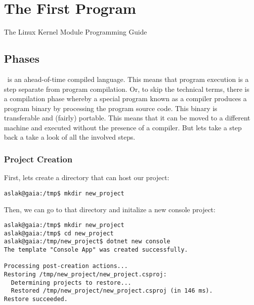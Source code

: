 \chapter{The First Program}
\label{sec:first}

\begin{inspiration}{The Linux Kernel Module Programming Guide\cite{lkmpg20070518}}
\end{inspiration}

\section{Phases}

\csharp\ is an ahead-of-time compiled language. This means that program execution is a step separate from program compilation. Or, to skip the technical terms, there is a compilation phase whereby a special program known as a compiler produces a program binary by processing the program source code. This binary is transferable and (fairly) portable. This means that it can be moved to a different machine and executed without the presence of a compiler. But lets take a step back a take a look of all the involved steps.

\subsection{Project Creation}

First, lets create a directory that can host our project:

\begin{verbatim}
aslak@gaia:/tmp$ mkdir new_project
\end{verbatim}

Then, we can go to that directory and initalize a new console project:

\begin{verbatim}
aslak@gaia:/tmp$ mkdir new_project
aslak@gaia:/tmp$ cd new_project
aslak@gaia:/tmp/new_project$ dotnet new console
The template "Console App" was created successfully.

Processing post-creation actions...
Restoring /tmp/new_project/new_project.csproj:
  Determining projects to restore...
  Restored /tmp/new_project/new_project.csproj (in 146 ms).
Restore succeeded.
\end{verbatim}

